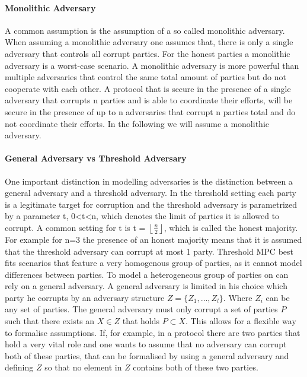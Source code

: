 \paragraph{Monolithic Adversary}
A common assumption is the assumption of a so called monolithic adversary. When assuming a monolithic adversary one assumes that, there is only a single adversary that controls all corrupt parties. For the honest parties a monolithic adversary is a worst-case scenario. A monolithic adversary is more powerful than multiple adversaries that control the same total amount of parties but do not cooperate with each other. A protocol that is secure in the presence of a single adversary that corrupts n parties and is able to coordinate their efforts, will be secure in the presence of up to n adversaries that corrupt n parties total and do not coordinate their efforts. In the following we will assume a monolithic adversary.
\paragraph{General Adversary vs Threshold Adversary}
One important distinction in modelling adversaries is the distinction between a general adversary and a threshold adversary.
In the threshold setting each party is a legitimate target for corruption and the threshold adversary is parametrized by a parameter t, 0<t<n, which denotes the limit of parties it is allowed to corrupt. A common setting for t is t = $\left \lfloor{ \frac{n}{2} }\right \rfloor  $, which is called the honest majority. For example for n=3 the presence of an honest majority means that it is assumed that the threshold adversary can corrupt at most 1 party. Threshold MPC best fits scenarios that feature a very homogenous group of parties, as it cannot model differences between parties. To model a heterogeneous group of parties on can rely on a general adversary.  A general adversary is limited in his choice which party he corrupts by an adversary structure  
$ Z = \{ Z_1, \dots, Z_l  \} $. Where $ Z_i $ can be any set of parties. The general adversary must only corrupt a set of parties  $ P $ such that there exists an $ X \in Z $ that holds $ P \subset X $. This allows for a flexible way to formalise assumptions. If, for example, in a protocol there are two parties that hold a very vital role and one wants to assume that no adversary can corrupt both of these parties, that can be formalised by using a general adversary and defining $ Z $ so that no element in  $Z $ contains both of these two parties.  
 
